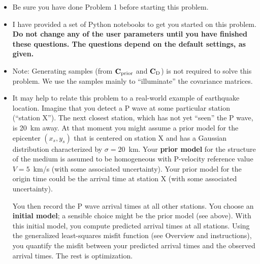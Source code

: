 \documentclass[11pt,titlepage,fleqn]{article}
\begin{document}
\begin{itemize}
\item Be sure you have done Problem 1 before starting this problem.

\item I have provided a set of Python notebooks to get you started on this problem. {\bf Do not change any of the user parameters until you have finished these questions. The questions depend on the default settings, as given.}

\item Note: Generating samples (from $\mbox{${\bf C}$}_{\rm prior}$ and $\mbox{${\bf C}$}_{\rm D}$) is not required to solve this problem. We use the samples mainly to ``illuminate'' the covariance matrices.

\item It may help to relate this problem to a real-world example of earthquake location. Imagine that you detect a P wave at some particular station (``station X''). The next closest station, which has not yet ``seen'' the P wave, is 20~km away. At that moment you might assume a prior model for the epicenter $(x_s, y_s)$ that is centered on station X and has a Gaussian distribution characterized by $\sigma = 20$~km. 
Your {\bf prior model} for the structure of the medium is assumed to be homogeneous with P-velocity reference value $V = 5$~km/s (with some associated uncertainty). Your prior model for the origin time could be the arrival time at station X (with some associated uncertainty).

You then record the P wave arrival times at all other stations. You choose an {\bf initial model}; a sensible choice might be the prior model (see above). With this initial model, you compute predicted arrival times at all stations. Using the generalized least-squares misfit function (see Overview and instructions), you quantify the misfit between your predicted arrival times and the observed arrival times. The rest is optimization.

\end{itemize}

\end{document}
